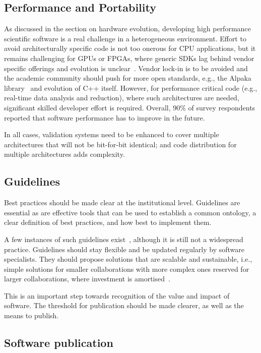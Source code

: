 \subsection{Performance and Portability}

As discussed in the section on hardware evolution, developing high performance scientific software is a real challenge in a heterogeneous environment. Effort to avoid architecturally specific code is not too onerous for CPU applications, but it remains challenging for GPUs or FPGAs, where generic SDKs lag behind vendor specific offerings and evolution is unclear~\cite{atif2023evaluatingportableparallelizationstrategies}. Vendor lock-in is to be avoided and the academic community should push for more open standards, e.g., the Alpaka library~\cite{MathesP3MA2017} and evolution of C++ itself. However, for performance critical code (e.g., real-time data analysis and reduction), where such architectures are needed, significant skilled developer effort is required. Overall, 90\% of survey respondents reported that software performance has to improve in the future.

In all cases, validation systems need to be enhanced to cover multiple architectures that will not be bit-for-bit identical; and code distribution for multiple architectures adds complexity.

\subsection{Guidelines}

Best practices should be made clear at the institutional level. Guidelines are essential as are effective tools that can be used to establish a common ontology, a clear definition of best practices, and how best to implement them. 

A few instances of such guidelines exist~\cite{RSQkit}, although it is still not a widespread practice. Guidelines should stay flexible and be updated regularly by software specialists. They should propose solutions that are scalable and sustainable, i.e., simple solutions for smaller collaborations with more complex ones reserved for larger collaborations, where investment is amortised~\cite{australian_research_data_commons_2022_6378082}.

This is an important step towards recognition of the value and impact of software. The threshold for publication should be made clearer, as well as the means to publish.


\subsection{Software publication}

